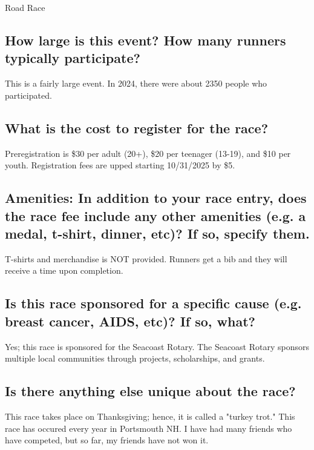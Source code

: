 \documentclass[letterpaper]{article}
\begin{document}
Road Race

\subsection{How large is this event? How many runners typically participate?}\label{how-large-is-this-event-how-many-runners-typically-participate}

This is a fairly large event. In 2024, there were about 2350 people who participated.

\subsection{What is the cost to register for the race?}\label{what-is-the-cost-to-register-for-the-race}

Preregistration is \$30 per adult (20+), \$20 per teenager (13-19), and \$10 per youth. Registration fees are upped starting 10/31/2025 by \$5.

\subsection{Amenities: In addition to your race entry, does the race fee include any other amenities (e.g. a medal, t-shirt, dinner, etc)? If so, specify them.}\label{amenities-in-addition-to-your-race-entry-does-the-race-fee-include-any-other-amenities-e.g.-a-medal-t-shirt-dinner-etc-if-so-specify-them.}

T-shirts and merchandise is NOT provided. Runners get a bib and they will receive a time upon completion.

\subsection{Is this race sponsored for a specific cause (e.g. breast cancer, AIDS, etc)? If so, what?}\label{is-this-race-sponsored-for-a-specific-cause-e.g.-breast-cancer-aids-etc-if-so-what}

Yes; this race is sponsored for the Seacoast Rotary. The Seacoast Rotary sponsors multiple local communities through projects, scholarships, and grants.

\subsection{Is there anything else unique about the race?}\label{is-there-anything-else-unique-about-the-race}

This race takes place on Thanksgiving; hence, it is called a "turkey trot." This race has occured every year in Portsmouth NH. I have had many friends who have competed, but so far, my friends have not won it.
\end{document}
